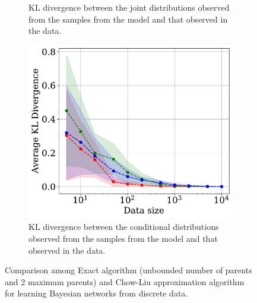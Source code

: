 \begin{figure}[htp!]
\begin{subfigure}{0.32\textwidth}
         \caption{KL divergence between the joint distributions observed from the samples from the model and that observed in the data.}
         \label{fig:kl_div_joint}
     \end{subfigure}
     \hfill
     \begin{subfigure}{0.32\textwidth}
         \centering
         \includegraphics[width=\textwidth]{plots/conditionals_kl_divergence.pdf}
         \caption{KL divergence between the conditional distributions observed from the samples from the model and that observed in the data.}
         \label{fig:kl_div_conditionals}
     \end{subfigure}
        \caption{Comparison among Exact algorithm (unbounded number of parents and 2 maximum parents) and Chow-Liu approximation algorithm for learning Bayesian networks from discrete data.}
        \label{fig:str_learning_comp}
\end{figure}

